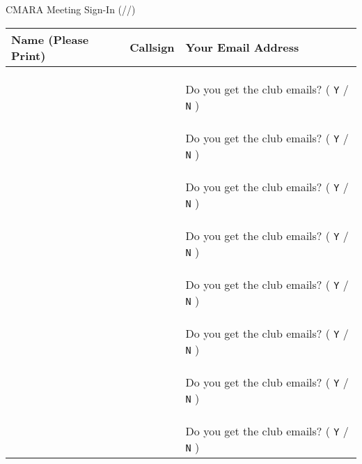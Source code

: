 \documentclass[10pt,letterpaper]{article}
\begin{document}
\begin{center}

{\Large CMARA Meeting Sign-In (\hspace{1cm}/\hspace{1cm}/\hspace{1cm})}
\medskip

\noindent
\begin{tabular}{|p{5cm}|p{3cm}|p{6cm}|}
  \hline
  Name (Please Print) & Callsign & Your Email Address \\ \hline

  && \\ && \\ && \\ && \small{Do you get the club emails? ( {\large\texttt{Y}} / {\large\texttt{N}} )} \\ \hline
  && \\ && \\ && \\ && \small{Do you get the club emails? ( {\large\texttt{Y}} / {\large\texttt{N}} )} \\ \hline
  && \\ && \\ && \\ && \small{Do you get the club emails? ( {\large\texttt{Y}} / {\large\texttt{N}} )} \\ \hline
  && \\ && \\ && \\ && \small{Do you get the club emails? ( {\large\texttt{Y}} / {\large\texttt{N}} )} \\ \hline
  && \\ && \\ && \\ && \small{Do you get the club emails? ( {\large\texttt{Y}} / {\large\texttt{N}} )} \\ \hline
  && \\ && \\ && \\ && \small{Do you get the club emails? ( {\large\texttt{Y}} / {\large\texttt{N}} )} \\ \hline
  && \\ && \\ && \\ && \small{Do you get the club emails? ( {\large\texttt{Y}} / {\large\texttt{N}} )} \\ \hline
  && \\ && \\ && \\ && \small{Do you get the club emails? ( {\large\texttt{Y}} / {\large\texttt{N}} )} \\ \hline

\end{tabular}
\end{center}
\end{document}
